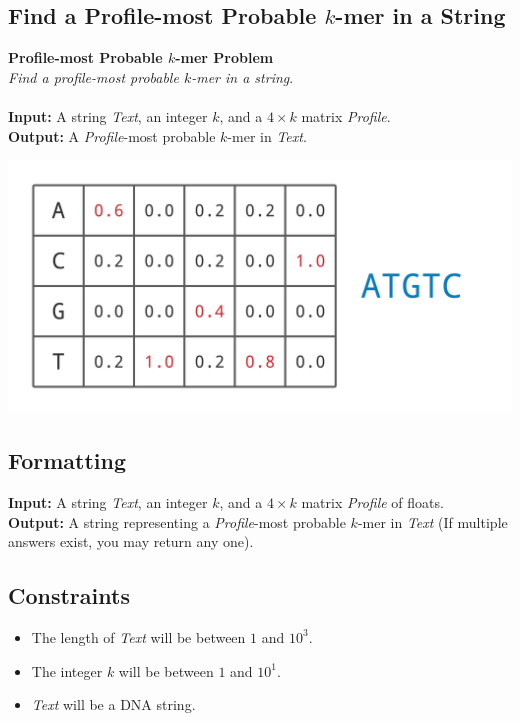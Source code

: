 \documentclass{article}
\begin{document}
\subsection{Find a Profile-most Probable $k$-mer in a String}
\hline\vspace{5}
\noindent\textbf{Profile-most Probable $k$-mer Problem}\\
\emph{Find a profile-most probable $k$-mer in a string}.\\ \\
\textbf{Input:} A string \emph{Text}, an integer $k$, and a $4\times k$ matrix \emph{Profile}.\\
\textbf{Output:} A \emph{Profile}-most probable $k$-mer in \emph{Text}.
\begin{center}
    \includegraphics[scale=0.32]{c2/logos/2C.png} 
\end{center}
\hline\vspace{5}

\subsection*{Formatting}
\textbf{Input:} A string \emph{Text}, an integer $k$, and a $4\times k$ matrix \emph{Profile} of floats.\\
\noindent\textbf{Output:} A string representing a \emph{Profile}-most probable $k$-mer in \emph{Text} (If multiple answers exist, you may return any one).

\subsection*{Constraints}
\begin{itemize}
    \item The length of \emph{Text} will be between $1$ and $10^3$.
    \item The integer $k$ will be between $1$ and $10^1$.
    \item \emph{Text} will be a DNA string.
\end{itemize}
\pagebreak
\end{document}
